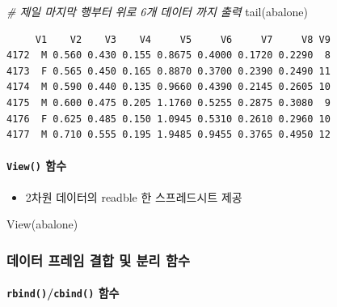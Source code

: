 \documentclass[
  11pt,
]{krantz}
\newenvironment{Shaded}{\begin{snugshade}}{\end{snugshade}}
\newcommand{\CommentTok}[1]{\textcolor[rgb]{0.37,0.37,0.37}{\textit{#1}}}
\newcommand{\FunctionTok}[1]{\textcolor[rgb]{0,0,0}{#1}}
\newcommand{\NormalTok}[1]{#1}
\providecommand{\tightlist}{%
  \setlength{\itemsep}{0pt}\setlength{\parskip}{0pt}}
\begin{document}
\begin{Shaded}
\begin{Highlighting}[]
\CommentTok{\# 제일 마지막 행부터 위로 6개 데이터 까지 출력}
\FunctionTok{tail}\NormalTok{(abalone)}
\end{Highlighting}
\end{Shaded}

\begin{verbatim}
     V1    V2    V3    V4     V5     V6     V7     V8 V9
4172  M 0.560 0.430 0.155 0.8675 0.4000 0.1720 0.2290  8
4173  F 0.565 0.450 0.165 0.8870 0.3700 0.2390 0.2490 11
4174  M 0.590 0.440 0.135 0.9660 0.4390 0.2145 0.2605 10
4175  M 0.600 0.475 0.205 1.1760 0.5255 0.2875 0.3080  9
4176  F 0.625 0.485 0.150 1.0945 0.5310 0.2610 0.2960 10
4177  M 0.710 0.555 0.195 1.9485 0.9455 0.3765 0.4950 12
\end{verbatim}

\normalsize

\hypertarget{view-fun}{%
\paragraph*{\texorpdfstring{\texttt{View()} 함수}{View() 함수}}\label{view-fun}}

\begin{itemize}
\tightlist
\item
  2차원 데이터의 readble 한 스프레드시트 제공
\end{itemize}

\footnotesize

\begin{Shaded}
\begin{Highlighting}[]
\FunctionTok{View}\NormalTok{(abalone)}
\end{Highlighting}
\end{Shaded}

\normalsize

\hypertarget{df-merge-split}{%
\subsubsection*{데이터 프레임 결합 및 분리 함수}\label{df-merge-split}}


\hypertarget{rbind-cbind}{%
\paragraph*{\texorpdfstring{\texttt{rbind()}/\texttt{cbind()} 함수}{rbind()/cbind() 함수}}\label{rbind-cbind}}
\end{document}

